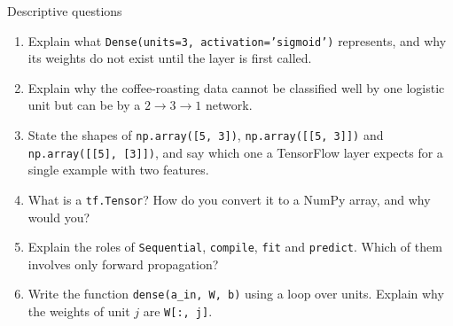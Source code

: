 \documentclass[aspectratio=169,10pt]{beamer}
\begin{document}
\begin{frame}{Descriptive questions}
  \footnotesize
  \begin{enumerate}
    \item Explain what \texttt{Dense(units=3, activation='sigmoid')} represents, and why its
          weights do not exist until the layer is first called. \hfill{}
    \item Explain why the coffee-roasting data cannot be classified well by one logistic unit
          but can be by a $2\to3\to1$ network. \hfill{}
    \item State the shapes of \texttt{np.array([5, 3])}, \texttt{np.array([[5, 3]])} and
          \texttt{np.array([[5], [3]])}, and say which one a TensorFlow layer expects for a
          single example with two features. \hfill{}
    \item What is a \texttt{tf.Tensor}? How do you convert it to a NumPy array, and why would
          you? \hfill{}
    \item Explain the roles of \texttt{Sequential}, \texttt{compile}, \texttt{fit} and
          \texttt{predict}. Which of them involves only forward propagation? \hfill{}
    \item Write the function \texttt{dense(a\_in, W, b)} using a loop over units. Explain why
          the weights of unit $j$ are \texttt{W[:, j]}. \hfill{}
  \end{enumerate}
\end{frame}
\end{document}
